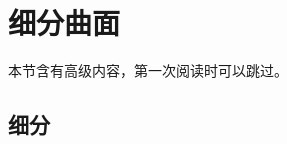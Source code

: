 \section{细分曲面}\label{sec:细分曲面}
\begin{remark}
    本节含有高级内容，第一次阅读时可以跳过。
\end{remark}

\subsection{细分}\label{sub:细分}
